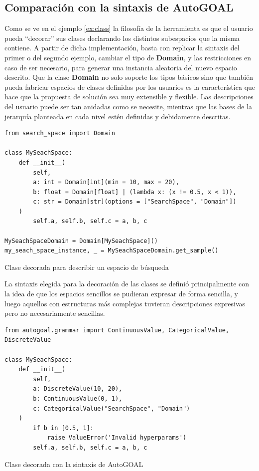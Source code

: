 \subsection{Comparación con la sintaxis de AutoGOAL}

Como se ve en el ejemplo \ref{ex:class} la filosofía de la herramienta es que el usuario pueda “decorar” sus
clases declarando los distintos subespacios que la misma contiene. A partir de dicha implementación, basta
con replicar la sintaxis del primer o del segundo ejemplo, cambiar el tipo de {\bf Domain}, y las restricciones
en caso de ser necesario, para generar una instancia aleatoria del nuevo espacio descrito. Que la clase
    {\bf Domain} no solo soporte los tipos básicos sino que también pueda fabricar espacios de clases definidas por
los usuarios es la característica que hace que la propuesta de solución sea muy extensible y flexible. Las
descripciones del usuario puede ser tan anidadas como se necesite, mientras que las bases de la jerarquía
planteada en cada nivel estén definidas y debidamente descritas.

\begin{listing}[!ht]
    \begin{verbatim}
from search_space import Domain

class MySeachSpace:
    def __init__(
        self, 
        a: int = Domain[int](min = 10, max = 20),
        b: float = Domain[float] | (lambda x: (x != 0.5, x < 1)),
        c: str = Domain[str](options = ["SearchSpace", "Domain"])
    )
        self.a, self.b, self.c = a, b, c

MySeachSpaceDomain = Domain[MySeachSpace]()
my_seach_space_instance, _ = MySeachSpaceDomain.get_sample()
    \end{verbatim}
    \caption{Clase decorada para describir un espacio de búsqueda}
    \label{ex:class}
\end{listing}


La sintaxis elegida para la decoración de las clases se definió principalmente con la idea de
que los espacios sencillos se pudieran expresar de forma sencilla, y luego aquellos con estructuras más
complejas tuvieran descripciones expresivas pero no necesariamente sencillas.



\begin{listing}[!ht]
    \begin{verbatim}
from autogoal.grammar import ContinuousValue, CategoricalValue, DiscreteValue

class MySeachSpace:
    def __init__(
        self, 
        a: DiscreteValue(10, 20),
        b: ContinuousValue(0, 1),
        c: CategoricalValue("SearchSpace", "Domain")
    )
        if b in [0.5, 1]:
            raise ValueError('Invalid hyperparams')
        self.a, self.b, self.c = a, b, c
    \end{verbatim}
    \caption{Clase decorada con la sintaxis de AutoGOAL}
    \label{ex:autogoal}
\end{listing}


